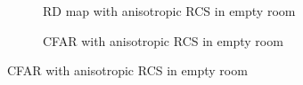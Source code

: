 \documentclass[12pt,DIV14,BCOR12mm,a4paper,footinclude=false,headinclude,parskip=half-,twoside,openright,cleardoublepage=empty,toc=index,bibliography=totoc,listof=totoc]{scrreprt}
\numberwithin{equation}{chapter}
\begin{document}
\begin{figure}[t]
        \centering
        \begin{subfigure}{0.45\textwidth}
            \centering
            \caption{RD map with anisotropic RCS in empty room}
        \end{subfigure}\hspace{0.5cm}
        \begin{subfigure}{0.45\textwidth}
            \centering
            \caption{CFAR with anisotropic RCS in empty room}
        \end{subfigure}

\end{figure}
\end{document}
